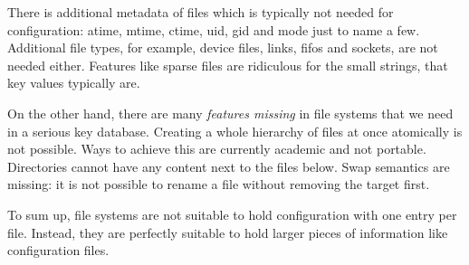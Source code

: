There is additional metadata of files which is typically not needed for configuration\+: atime, mtime, ctime, uid, gid and mode just to name a few. Additional file types, for example, device files, links, fifos and sockets, are not needed either. Features like sparse files are ridiculous for the small strings, that key values typically are.

On the other hand, there are many {\itshape features missing} in file systems that we need in a serious key database. Creating a whole hierarchy of files at once atomically is not possible. Ways to achieve this are currently academic and not portable. Directories cannot have any content next to the files below. Swap semantics are missing\+: it is not possible to rename a file without removing the target first.

To sum up, file systems are not suitable to hold configuration with one entry per file. Instead, they are perfectly suitable to hold larger pieces of information like configuration files. 
